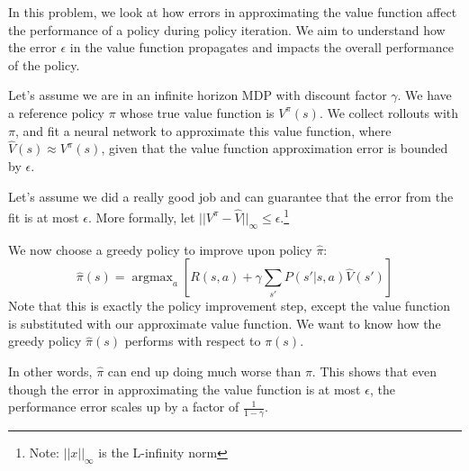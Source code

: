 \documentclass[11pt]{article}
\DeclareMathOperator*{\argmax}{argmax}
\begin{document}
\setlength{\fboxrule}{.5mm}\setlength{\fboxsep}{1.2mm}
\newlength{\boxlength}\setlength{\boxlength}{\textwidth}
\addtolength{\boxlength}{-4mm}
\begin{center}\end{center}
\vspace{5mm}
\setlength{\fboxrule}{0.1pt}\setlength{\fboxsep}{2mm}

\def\ind{\hspace*{0.3in}}
\def\gap{0.2in}

\vskip \gap {}
\newline

\noindent In this problem, we look at how errors in approximating the value function affect the performance of a policy during policy iteration. We aim to understand how the error $\epsilon$ in the value function propagates and impacts the overall performance of the policy.
\newline

\noindent Let’s assume we are in an infinite horizon MDP with discount factor $\gamma$. We have a reference policy $\pi$ whose true value function is $V^\pi(s)$. We collect rollouts with $\pi$, and fit a neural network to approximate this value function, where $\hat V(s) \approx V^\pi(s)$, given that the value function approximation error is bounded by $\epsilon$.
\newline

\noindent Let’s assume we did a really good job and can guarantee that the error from the fit is at most $\epsilon$. More formally, let $|| V^\pi - \hat V||_{\infty} \leq \epsilon$.\footnote{Note: $|| x ||_{\infty}$ is the L-infinity norm}
\newline

\noindent We now choose a greedy policy to improve upon policy $\hat{\pi}$:
$$\hat \pi(s) = \argmax_a \left[R(s,a) +  \gamma \sum_{s'} P(s'|s,a)\hat V(s')\right]$$
\noindent Note that this is exactly the policy improvement step, except the value function is substituted with our approximate value function. We want to know how the greedy policy  $\hat \pi(s)$ performs with respect to $\pi (s)$. 
\newline

\noindent In other words, $\hat{\pi}$ can end up doing much worse than $\pi$. This shows that even though the error in approximating the value function is at most $\epsilon$, the performance error scales up by a factor of $\frac{1}{1-\gamma}$. 
\newline
\end{document}
